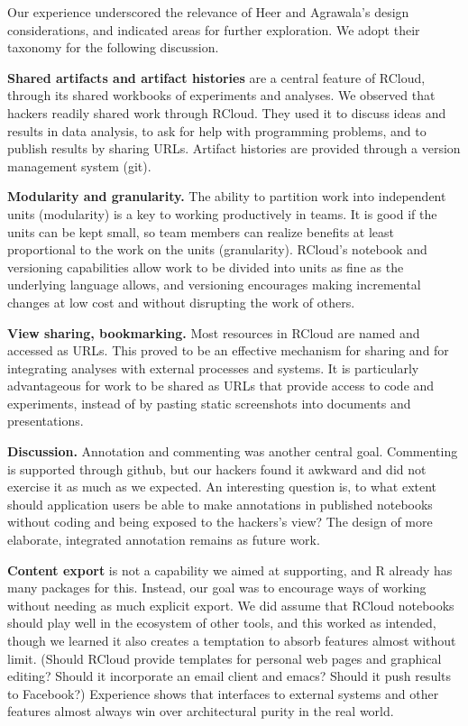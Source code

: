 Our experience underscored the relevance of Heer and Agrawala's design
considerations, and indicated areas for further exploration. We adopt
their taxonomy for the following discussion.

{\bf Shared artifacts and artifact histories} are a central feature
of RCloud, through its shared workbooks of experiments and analyses.
We observed that hackers readily shared work through RCloud. They
used it to discuss ideas and results in data analysis, to ask for help
with programming problems, and to publish results by sharing URLs.
Artifact histories are provided through a version management system (git).

{\bf Modularity and granularity.} The ability to partition work into
independent units (modularity) is a key to working productively in teams.
It is good if the units can be kept small, so team members can realize
benefits at least proportional to the work on the units (granularity).
RCloud's notebook and versioning capabilities allow work to be divided
into units as fine as the underlying language allows, and versioning
encourages making incremental changes at low cost and without disrupting
the work of others. 

{\bf View sharing, bookmarking.} Most resources in RCloud are named
and accessed as URLs. This proved to be an effective mechanism for
sharing and for integrating analyses with external processes and systems.
It is particularly advantageous for work to be shared as URLs that
provide access to code and experiments, instead of by pasting static
screenshots into documents and presentations.

{\bf Discussion.} Annotation and commenting was another central goal.
Commenting is supported through github, but our hackers found it
awkward and did not exercise it as much as we expected.
An interesting question is, to what extent should application users
be able to make annotations in published notebooks without coding
and being exposed to the hackers's view? The design of
more elaborate, integrated annotation remains as future work.

{\bf Content export} is not a capability we aimed at supporting,
and R already has many packages for this. Instead, our goal was to
encourage ways of working without needing as much explicit export.
We did assume that RCloud notebooks should play well in the ecosystem
of other tools, and this worked as intended, though we learned it also
creates a temptation to absorb features almost without limit. (Should
RCloud provide templates for personal web pages and graphical
editing? Should it incorporate an email client and emacs?
Should it push results to Facebook?) Experience shows that interfaces
to external systems and other features almost always win over architectural
purity in the real world. 

